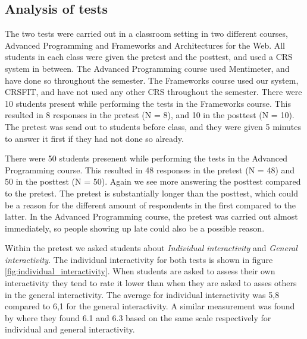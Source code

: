\subsection{Analysis of tests}

The two tests were carried out in a classroom setting in two different courses, Advanced Programming and Frameworks and Architectures for the Web. All students in each class were given the pretest and the posttest, and used a CRS system in between. The Advanced Programming course used Mentimeter, and have done so throughout the semester. The Frameworks course used our system, CRSFIT, and have not used any other CRS throughout the semester. 
There were 10 students present while performing the tests in the Frameworks course. This resulted in 8 responses in the pretest (N = 8), and 10 in the posttest (N = 10). The pretest was send out to students before class, and they were given 5 minutes to answer it first if they had not done so already. 

There were 50 students presenent while performing the tests in the Advanced Programming course. This resulted in 48 responses in the pretest (N = 48) and 50 in the posttest (N = 50). Again we see more answering the posttest compared to the pretest. The pretest is substantially longer than the posttest, which could be a reason for the different amount of respondents in the first compared to the latter. In the Advanced Programming course, the pretest was carried out almost immediately, so people showing up late could also be a possible reason.


Within the pretest we asked students about \emph{Individual interactivity} and \emph{General interactivity}. The individual interactivity for both tests is shown in figure \ref{fig:individual_interactivity}. When students are asked to assess their own interactivity they tend to rate it lower than when they are asked to asses others in the general interactivity. The average for individual interactivity was 5,8 compared to 6,1 for the general interactivity. A similar measurement was found by  where they found 6.1 and 6.3 based on the same scale respectively for individual and general interactivity. 

